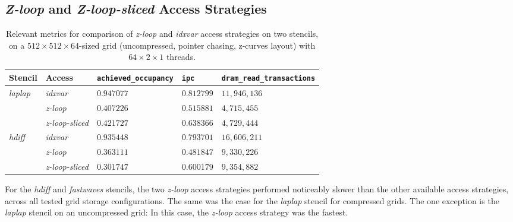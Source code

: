 



\subsection{\emph{Z-loop} and \emph{Z-loop-sliced} Access Strategies}

\begin{table}
    \begin{tabular}{l l p{2.5cm} p{2.5cm} p{2.5cm}}
        \hline
        \textbf{Stencil} & \textbf{Access} & \textbf{\texttt{achieved\_\allowbreak occupancy}} & \textbf{\texttt{ipc}} & \textbf{\texttt{dram\_\allowbreak read\_\allowbreak transactions}} \\
        \hline
        \hline
        \emph{laplap} & \emph{idxvar} & $0.947077$ & $0.812799$ & $11,946,136$ \\
        & \emph{z-loop} & $0.407226$ & $0.515881$ & $4,715,455$ \\
        & \emph{z-loop-sliced} & $0.421727$ & $0.638366$ & $4,729,444$ \\
        \hline
        \emph{hdiff} & \emph{idxvar} & $0.935448$ & $0.793701$ & $16,606,211$ \\
        & \emph{z-loop} & $0.363111$ & $0.481847$ & $9,330,226$ \\
        & \emph{z-loop-sliced} & $0.301747$ & $0.600179$ & $9,354,882$ \\
        \hline
    \end{tabular}
    \caption{\label{tab:access-z-loop} Relevant metrics for comparison of \emph{z-loop} and \emph{idxvar} access strategies on two stencils, on a $512\times 512\times 64$-sized grid (uncompressed, pointer chasing, z-curves layout) with $64\times 2\times 1$ threads.}
\end{table}

For the \emph{hdiff} and \emph{fastwaves} stencils, the two \emph{z-loop} access strategies performed noticeably slower than the other available access strategies, across all tested grid storage configurations. The same was the case for the \emph{laplap} stencil for compressed grids. The one exception is the \emph{laplap} stencil on an uncompressed grid: In this case, the \emph{z-loop} access strategy was the fastest.

